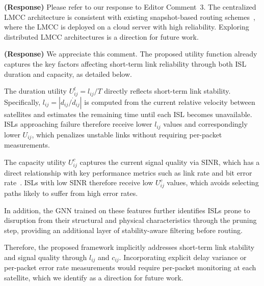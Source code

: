 \documentclass[letter]{article}
\begin{document}
\vspace{5mm}
{\bf (Response)}
Please refer to our response to Editor Comment~3. The centralized LMCC architecture is consistent with existing snapshot-based routing schemes~\cite{han2023time}, where the LMCC is deployed on a cloud server with high reliability. Exploring distributed LMCC architectures is a direction for future work.

\vspace{10mm}
\noindent {}

\vspace{5mm}
{\bf (Response)}
We appreciate this comment. The proposed utility function already captures the key factors affecting short-term link reliability through both ISL duration and capacity, as detailed below.

The duration utility $U_{ij}^l = l_{ij}/T$ directly reflects short-term link stability. Specifically, $l_{ij} = |d_{ij}/\dot{d}_{ij}|$ is computed from the current relative velocity between satellites and estimates the remaining time until each ISL becomes unavailable. ISLs approaching failure therefore receive lower $l_{ij}$ values and correspondingly lower $U_{ij}$, which penalizes unstable links without requiring per-packet measurements.

The capacity utility $U_{ij}^c$ captures the current signal quality via SINR, which has a direct relationship with key performance metrics such as link rate and bit error rate~\cite{cao2025dense}. ISLs with low SINR therefore receive low $U_{ij}^c$ values, which avoids selecting paths likely to suffer from high error rates.

In addition, the GNN trained on these features further identifies ISLs prone to disruption from their structural and physical characteristics through the pruning step, providing an additional layer of stability-aware filtering before routing.

Therefore, the proposed framework implicitly addresses short-term link stability and signal quality through $l_{ij}$ and $c_{ij}$. Incorporating explicit delay variance or per-packet error rate measurements would require per-packet monitoring at each satellite, which we identify as a direction for future work.

\vspace{10mm}
\noindent {}
\end{document}
